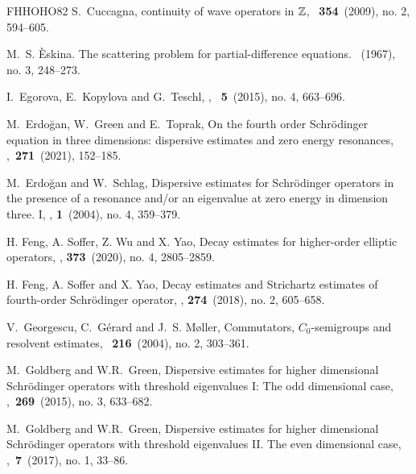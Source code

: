 \documentclass[reqno, 11pt]{amsart}
\numberwithin{equation}{section}
\begin{document}
\begin{thebibliography}{FHHOHO82}
S.~Cuccagna,
 continuity of wave operators in {$\Bbb Z$},
~{\bf 354}~(2009), no. 2, 594--605.

M.~S. \`Eskina.
\newblock The scattering problem for partial-difference equations.
~(1967), no. 3, 248--273.

I.~Egorova, E.~Kopylova and G.~Teschl,
,
~{\bf5}~(2015), no. 4, 663--696.

M.~Erdo\u{g}an, W.~Green and E.~Toprak,
\newblock On the fourth order {S}chr\"odinger equation in three dimensions: dispersive estimates and zero energy resonances,
,~{\bf271}~(2021), 152--185.

M.~Erdo\u{g}an and W.~Schlag,
\newblock Dispersive estimates for {S}chr\"odinger operators in the presence of
  a resonance and/or an eigenvalue at zero energy in dimension three. {I},
, {\bf1}~(2004), no. 4, 359--379.


H. Feng, A. Soffer, Z. Wu and X. Yao,
\newblock Decay estimates for higher-order elliptic operators,
, {\bf373}~(2020), no. 4, 2805--2859.

H. Feng, A. Soffer and  X. Yao,
\newblock Decay estimates and Strichartz estimates of fourth-order Schr\"{o}dinger operator, , {\bf274}~(2018), no. 2, 605--658.

V.~Georgescu, C.~G\'erard and J.~S. M{\o}ller,
\newblock Commutators, {$C_0$}-semigroups and resolvent estimates,
~{\bf216}~(2004), no. 2, 303--361.

M.~Goldberg and W.R.~Green,
\newblock Dispersive estimates for higher dimensional {S}chr\"{o}dinger operators with threshold eigenvalues {I}: {T}he odd dimensional case,
,~{\bf 269}~(2015), no. 3, 633--682.

M.~Goldberg and W.R.~Green,
\newblock Dispersive estimates for higher dimensional {S}chr\"odinger operators with threshold eigenvalues {II}. {T}he even dimensional case,
,~{\bf 7}~(2017), no. 1, 33--86.



\end{thebibliography}
\end{document}
